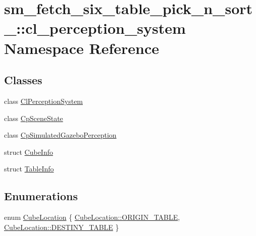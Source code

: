 \hypertarget{namespacesm__fetch__six__table__pick__n__sort__1_1_1cl__perception__system}{}\section{sm\+\_\+fetch\+\_\+six\+\_\+table\+\_\+pick\+\_\+n\+\_\+sort\+\_\+:\+:cl\+\_\+perception\+\_\+system Namespace Reference}
\label{namespacesm__fetch__six__table__pick__n__sort__1_1_1cl__perception__system}
\subsection*{Classes}
\begin{DoxyCompactItemize}
\item 
class \hyperlink{classsm__fetch__six__table__pick__n__sort__1_1_1cl__perception__system_1_1ClPerceptionSystem}{Cl\+Perception\+System}
\item 
class \hyperlink{classsm__fetch__six__table__pick__n__sort__1_1_1cl__perception__system_1_1CpSceneState}{Cp\+Scene\+State}
\item 
class \hyperlink{classsm__fetch__six__table__pick__n__sort__1_1_1cl__perception__system_1_1CpSimulatedGazeboPerception}{Cp\+Simulated\+Gazebo\+Perception}
\item 
struct \hyperlink{structsm__fetch__six__table__pick__n__sort__1_1_1cl__perception__system_1_1CubeInfo}{Cube\+Info}
\item 
struct \hyperlink{structsm__fetch__six__table__pick__n__sort__1_1_1cl__perception__system_1_1TableInfo}{Table\+Info}
\end{DoxyCompactItemize}
\subsection*{Enumerations}
\begin{DoxyCompactItemize}
\item 
enum \hyperlink{namespacesm__fetch__six__table__pick__n__sort__1_1_1cl__perception__system_a371363065945abbb60dad8b56601afa0}{Cube\+Location} \{ \hyperlink{namespacesm__fetch__six__table__pick__n__sort__1_1_1cl__perception__system_a371363065945abbb60dad8b56601afa0ae5ee34c3ef8ec4a46a00a218416c7b1d}{Cube\+Location\+::\+O\+R\+I\+G\+I\+N\+\_\+\+T\+A\+B\+LE}, 
\hyperlink{namespacesm__fetch__six__table__pick__n__sort__1_1_1cl__perception__system_a371363065945abbb60dad8b56601afa0acdc3fdda18904b4a1ac0be036c86f973}{Cube\+Location\+::\+D\+E\+S\+T\+I\+N\+Y\+\_\+\+T\+A\+B\+LE}
 \}
\end{DoxyCompactItemize}


